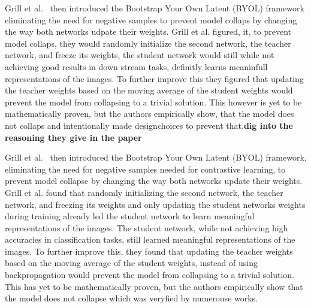 Grill et al.~\cite{Grill2020} then introduced the Bootstrap Your Own Latent (BYOL) framework eliminating the need for negative samples to prevent model collaps by changing the way both networks udpate their weights. 
Grill et al. figured, it, to prevent model collaps, they would randomly initialize the second network, the teacher network, and freeze its weights, the student network would still while not achieving good results in down stream tasks, definitly learns meaninfull representations of the images.
To further improve this they figured that updating the teacher weights based on the moving average of the student weights would prevent the model from collapsing to a trivial solution.
This however is yet to be mathematically proven, but the authors empirically show, that the model does not collaps and intentionally made designchoices to prevent that.\textbf{dig into the reasoning they give in the paper}

Grill et al.~\cite{Grill2020} then introduced the Bootstrap Your Own Latent (BYOL) framework, eliminating the need for negative samples needed for contrastive learning, to prevent model collapse by changing the way both networks update their weights.
Grill et al. found that randomly initializing the second network, the teacher network, and freezing its weights and only updating the student networks weights during training already led the student network to learn meaningful representations of the images.
The student network, while not achieving high accuracies in classification tasks, still learned meaningful representations of the images.
To further improve this, they found that updating the teacher weights based on the moving average of the student weights, instead of using backpropagation would prevent the model from collapsing to a trivial solution.
This has yet to be mathematically proven, but the authors empirically show that the model does not collapse which was veryfied by numerouse works.

